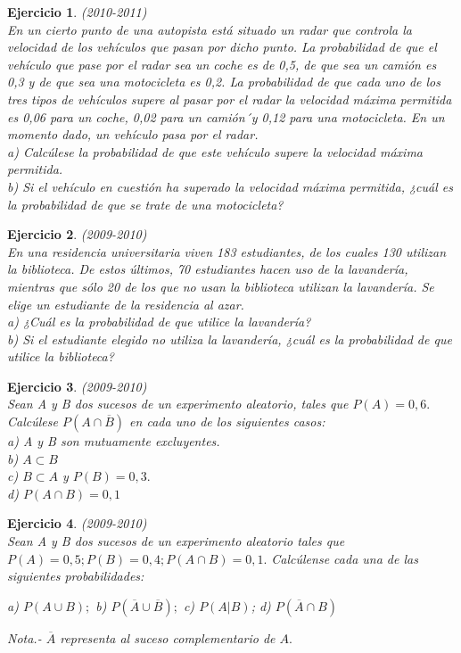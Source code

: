 \documentclass[12pt, a4paper]{amsart}
\newtheorem{ejer}{Ejercicio}
\begin{document}
\begin{ejer}\em (2010-2011)\\
En un cierto punto de una autopista está situado un radar que controla la velocidad de los vehículos que pasan por dicho punto. La probabilidad de que el vehículo que pase por el radar sea un coche es de 0,5, de que sea un camión es 0,3 y de que sea una motocicleta es 0,2. La probabilidad de que cada uno de los tres tipos de vehículos supere al pasar por el radar la velocidad máxima permitida es 0,06 para un coche, 0,02 para un camión´y 0,12 para una motocicleta. En un momento dado, un vehículo pasa por el radar.\\
a) Calcúlese la probabilidad de que este vehículo supere la velocidad máxima permitida.\\
b) Si el vehículo en cuestión ha superado la velocidad máxima permitida, ¿cuál es la probabilidad de que se trate de una motocicleta?
\end{ejer}

\begin{ejer}\em (2009-2010)\\%
En una residencia universitaria viven 183 estudiantes, de los cuales 130 utilizan la biblioteca. De estos últimos, 70 estudiantes hacen uso de la lavandería, mientras que sólo 20 de los que no usan la biblioteca utilizan la lavandería. Se elige un estudiante de la residencia al azar.\\
a) ¿Cuál es la probabilidad de que utilice la lavandería?\\
b) Si el estudiante elegido no utiliza la lavandería, ¿cuál es la probabilidad de que utilice la biblioteca?
\end{ejer}

\begin{ejer}\em (2009-2010)\\
Sean A y B dos sucesos de un experimento aleatorio, tales que $P(A) = 0,6.$ Calcúlese $P(A \cap \overline{B})$
en cada uno de los siguientes casos:\\
a) A y B son mutuamente excluyentes.\\
b) $A \subset B$\\
c) $B \subset A$ y $P(B)=0,3.$\\
d) $P(A\cap B)=0,1$
\end{ejer}

\begin{ejer}\em (2009-2010)\\%
Sean A y B dos sucesos de un experimento aleatorio tales que $P(A)=0,5; P(B)=0,4; P(A\cap B)=0,1.$ Calcúlense cada una de las siguientes probabilidades:
\begin{center}
a) $P(A\cup B);$\hspace*{5mm} b) $P(\overline{A}\cup \overline{B});$\hspace*{5mm} c) $P(A|B)$;\hspace*{5mm} d) $P(\overline{A}\cap B)$
\end{center}
Nota.- $\overline{A}$ representa al suceso complementario de $A.$
\end{ejer}
\end{document}
